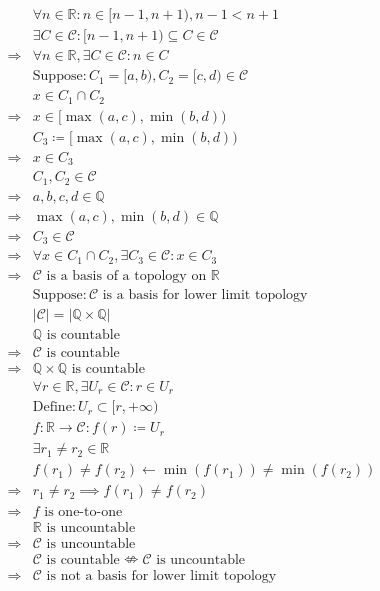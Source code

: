 \documentclass{article}
\begin{document}
\begin{equation*}
    \begin{split}
        &\forall n \in \mathbb{R}:n\in [n-1,n+1),n-1<n+1\\
        &\exists C\in\mathcal{C} :[n-1,n+1)\subseteq C\in\mathcal{C}\\
        \Rightarrow&\forall n\in\mathbb{R},\exists C\in\mathcal{C}:n\in C\\
        &\text{Suppose}:C_1=[a,b),C_2=[c,d)\in\mathcal{C}\\
        &x\in C_1\cap C_2\\
        \Rightarrow&x\in[\max(a,c),\min(b,d))\\
        &C_3\coloneqq [\max(a,c),\min(b,d))\\
        \Rightarrow&x\in C_3\\
        &C_1,C_2\in \mathcal{C} \\
        \Rightarrow&a,b,c,d\in\mathbb{Q} \\
        \Rightarrow&\max(a,c),\min(b,d)\in\mathbb{Q} \\
        \Rightarrow&C_3\in\mathcal{C} \\
        \Rightarrow&\forall x\in C_1\cap C_2,\exists C_3\in\mathcal{C}:x\in C_3\\
        \Rightarrow&\mathcal{C} \text{ is a basis of a topology on }\mathbb{R}\\
        &\text{Suppose}:\mathcal{C} \text{ is a basis for lower limit topology}\\
        &|\mathcal{C} |=|\mathbb{Q} \times\mathbb{Q} |\\
        &\mathbb{Q}\text{ is countable}\\
        \Rightarrow&\mathcal{C} \text{ is countable}\\
        \Rightarrow&\mathbb{Q} \times\mathbb{Q}\text{ is countable}\\
        &\forall r\in\mathbb{R} ,\exists U_r \in \mathcal{C} :r\in U_r\\
        &\text{Define}:U_r\subset [r,+\infty)\\
        &f:\mathbb{R} \rightarrow \mathcal{C} :f(r)\coloneqq U_r\\
        &\exists r_1\ne r_2\in \mathbb{R}\\
        &f(r_1)\ne f(r_2)\leftarrow \min(f(r_1))\ne \min(f(r_2))\\
        \Rightarrow&r_1\ne r_2\implies f(r_1)\ne f(r_2)\\
        \Rightarrow&f\text{ is one-to-one}\\
        &\mathbb{R} \text{ is uncountable}\\
        \Rightarrow&\mathcal{C} \text{ is uncountable}\\
        &\mathcal{C} \text{ is countable}\nLeftrightarrow\mathcal{C} \text{ is uncountable}\\
        \Rightarrow&\mathcal{C} \text{ is not a basis for lower limit topology}\\
    \end{split}
\end{equation*}
\end{document}
